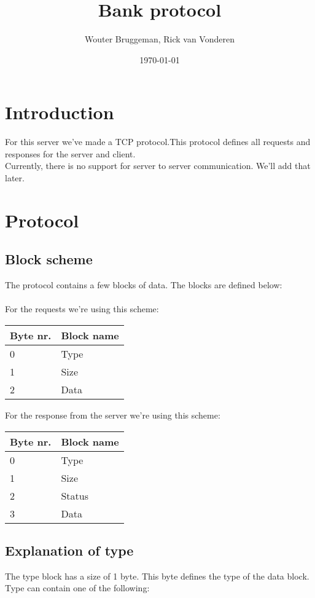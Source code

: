 \documentclass[12pt, a4paper]{article}
\title{Bank protocol}
\author{Wouter Bruggeman, Rick van Vonderen}
\date{\today}
\begin{document}
\maketitle
\newpage

\tableofcontents
\newpage

\section{Introduction}
For this server we've made a TCP protocol.This protocol defines all requests
and responses for the server and client.\\
Currently, there is no support for server to server communication. We'll add that later.\\
\newpage

\section{Protocol}
\subsection{Block scheme}
The protocol contains a few blocks of data. The blocks are defined below:\\
\\
For the requests we're using this scheme:\\
\begin{tabular}{| p{2cm} | p{5cm} |}
	\hline
	\textbf{Byte nr.} & \textbf{Block name} \\ \hline
	0 & Type \\ \hline
	1 & Size \\ \hline
	2 & Data \\ \hline
\end{tabular}

For the response from the server we're using this scheme:\\
\begin{tabular}{| p{2cm} | p{5cm} |}
	\hline
	\textbf{Byte nr.} & \textbf{Block name} \\ \hline
	0 & Type \\ \hline
	1 & Size \\ \hline
	2 & Status \\ \hline
	3 & Data \\ \hline
\end{tabular}

\newpage

\subsection{Explanation of type}
The type block has a size of 1 byte. This byte defines the type of the data block.\\
Type can contain one of the following:\\
\end{document}
